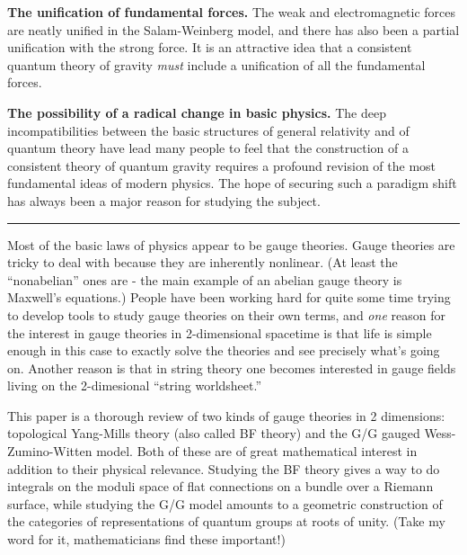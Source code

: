 \documentclass{article}
\def\tightlist{}
\renewcommand{\texttt}[1]{%
  \begingroup
  \ttfamily
  \begingroup\lccode`~=`/\lowercase{\endgroup\def~}{/\discretionary{}{}{}}%
  \begingroup\lccode`~=`[\lowercase{\endgroup\def~}{[\discretionary{}{}{}}%
  \begingroup\lccode`~=`.\lowercase{\endgroup\def~}{.\discretionary{}{}{}}%
  \catcode`/=\active\catcode`[=\active\catcode`.=\active
  \scantokens{#1\noexpand}%
  \endgroup
}
\begin{document}
\textbf{The unification of fundamental forces.} The weak and
electromagnetic forces are neatly unified in the Salam-Weinberg model,
and there has also been a partial unification with the strong force. It
is an attractive idea that a consistent quantum theory of gravity
\emph{must} include a unification of all the fundamental forces.

\textbf{The possibility of a radical change in basic physics.} The deep
incompatibilities between the basic structures of general relativity and
of quantum theory have lead many people to feel that the construction of
a consistent theory of quantum gravity requires a profound revision of
the most fundamental ideas of modern physics. The hope of securing such
a paradigm shift has always been a major reason for studying the
subject.

\begin{center}\rule{0.5\linewidth}{0.5pt}\end{center}


Most of the basic laws of physics appear to be gauge theories. Gauge
theories are tricky to deal with because they are inherently nonlinear.
(At least the ``nonabelian'' ones are - the main example of an abelian
gauge theory is Maxwell's equations.) People have been working hard for
quite some time trying to develop tools to study gauge theories on their
own terms, and \emph{one} reason for the interest in gauge theories in
2-dimensional spacetime is that life is simple enough in this case to
exactly solve the theories and see precisely what's going on. Another
reason is that in string theory one becomes interested in gauge fields
living on the 2-dimesional ``string worldsheet.''

This paper is a thorough review of two kinds of gauge theories in 2
dimensions: topological Yang-Mills theory (also called BF theory) and
the G/G gauged Wess-Zumino-Witten model. Both of these are of great
mathematical interest in addition to their physical relevance. Studying
the BF theory gives a way to do integrals on the moduli space of flat
connections on a bundle over a Riemann surface, while studying the G/G
model amounts to a geometric construction of the categories of
representations of quantum groups at roots of unity. (Take my word for
it, mathematicians find these important!)
\end{document}
